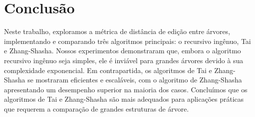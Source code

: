 \documentclass[12pt]{article}
\begin{document}
\section{Conclusão}
Neste trabalho, exploramos a métrica de distância de edição entre árvores, implementando e comparando três algoritmos principais: o recursivo ingênuo, Tai e Zhang-Shasha. Nossos experimentos demonstraram que, embora o algoritmo recursivo ingênuo seja simples, ele é inviável para grandes árvores devido à sua complexidade exponencial. Em contrapartida, os algoritmos de Tai e Zhang-Shasha se mostraram eficientes e escaláveis, com o algoritmo de Zhang-Shasha apresentando um desempenho superior na maioria dos casos. Concluímos que os algoritmos de Tai e Zhang-Shasha são mais adequados para aplicações práticas que requerem a comparação de grandes estruturas de árvore.



\end{document}
